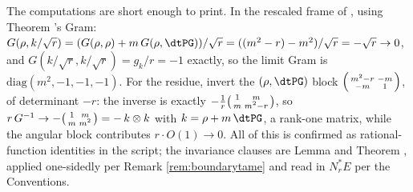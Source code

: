 The computations are short enough to print. In the rescaled frame of , using Theorem 's Gram: $G(\rho, k/\sqrt r) = (G(\rho,\rho) + m\,G(\rho,\dtPG))/\sqrt r = ((m^2 - r) - m^2)/\sqrt r = -\sqrt r \to 0$, and $G(k/\sqrt r, k/\sqrt r) = g_k/r = -1$ exactly, so the limit Gram is $\mathrm{diag}(m^2, -1, -1, -1)$. For the residue, invert the $(\rho, \dtPG)$ block $\begin{psmallmatrix} m^2 - r & -m \\ -m & 1 \end{psmallmatrix}$, of determinant $-r$: the inverse is exactly $-\tfrac1r \begin{psmallmatrix} 1 & m \\ m & m^2 - r \end{psmallmatrix}$, so $r\,G^{-1} \to -\begin{psmallmatrix} 1 & m \\ m & m^2 \end{psmallmatrix} = -\,k \otimes k$ with $k = \rho + m\,\dtPG$, a rank-one matrix, while the angular block contributes $r \cdot O(1) \to 0$. All of this is confirmed as rational-function identities in the script; the invariance clauses are Lemma  and Theorem , applied one-sidedly per Remark \ref{rem:boundarytame} and read in $N^*_rE$ per the Conventions.
